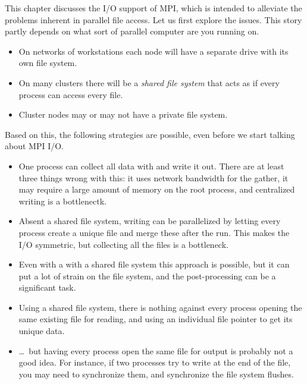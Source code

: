 

This chapter discusses the I/O support of MPI, which is intended
to alleviate the problems inherent in parallel file access.
Let us first explore the issues.
This story partly depends on what sort of parallel
computer are you running on.

\begin{itemize}
\item On networks of workstations each node will have a separate
  drive with its own file system.
\item On many clusters there will be a
  \emph{shared file system}
  that acts as if every process can access every file.
\item Cluster nodes may or may not have a private file system.
\end{itemize}

Based on this, the following strategies are possible, even before
we start talking about MPI I/O.

\begin{itemize}
\item One process can collect all data with 
  and write it out. There are at least three things wrong with this:
  it uses network bandwidth for the gather, it may require a large
  amount of memory on the root process, and centralized writing
  is a bottlenectk.
\item Absent a shared file system, writing can be parallelized by letting
  every process create a unique file and merge these after the run.
  This makes the I/O symmetric, but collecting all the files is a bottleneck.
\item Even with a with a shared file system this approach is possible,
  but it can put a lot of strain
  on the file system, and the post-processing can be a significant task.
\item Using a shared file system,
  there is nothing against every process opening the same existing file
  for reading, and using an individual file pointer to get its unique
  data.
\item \ldots~but having every process open the same file for output is
  probably not a good idea. For instance, if two processes try to write
  at the end of the file, you may need to synchronize them, and synchronize
  the file system flushes.
\end{itemize}

